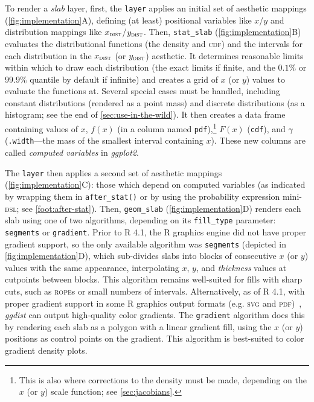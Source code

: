 \documentclass[journal]{vgtc}                     %
\begin{document}
To render a \textit{slab} layer, first, the \texttt{layer} applies an initial set of aesthetic mappings (\cref{fig:implementation}A), defining (at least) positional variables like $x$/$y$ and distribution mappings like $x_\textsc{dist}$/$y_\textsc{dist}$. Then, \texttt{stat\_slab} (\cref{fig:implementation}B) evaluates the distributional functions (the density and \textsc{cdf}) and the intervals for each distribution in the $x_\textsc{dist}$ (or $y_\textsc{dist}$) aesthetic. It determines reasonable limits within which to draw each distribution (the exact limits if finite, and the $0.1\%$ or $99.9\%$ quantile by default if infinite) and creates a grid of $x$ (or $y$) values to evaluate the functions at. Several special cases must be handled, including constant distributions (rendered as a point mass) and discrete distributions (as a histogram; see the end of \cref{sec:use-in-the-wild}). It then creates a data frame containing values of $x$,  $f(x)$ (in a column named \texttt{pdf}),\footnote{This is also where corrections to the density must be made, depending on the $x$ (or $y$) scale function; see \cref{sec:jacobians}.} $F(x)$ (\texttt{cdf}), and $\gamma$ (\texttt{.width}---the mass of the smallest interval containing $x$). These new columns are called \textit{computed variables} in \textit{ggplot2}.

The \texttt{layer} then applies a second set of aesthetic mappings (\cref{fig:implementation}C): those which depend on computed variables (as indicated by wrapping them in \texttt{after\_stat()} or by using the probability expression mini-\textsc{dsl}; see \cref{foot:after-stat}). Then, \texttt{geom\_slab} (\cref{fig:implementation}D) renders each slab using one of two algorithms, depending on its \texttt{fill\_type} parameter: \texttt{segments} or \texttt{gradient}. Prior to R 4.1, the R graphics engine did not have proper gradient support, so the only available algorithm was \texttt{segments} (depicted in \cref{fig:implementation}D), which sub-divides slabs into blocks of consecutive $x$ (or $y$) values with the same appearance, interpolating $x$, $y$, and \textit{thickness} values at cutpoints between blocks. This algorithm remains well-suited for fills with sharp cuts, such as \textsc{rope}s or small numbers of intervals. Alternatively, as of R 4.1, with proper gradient support in some R graphics output formats (e.g. \textsc{svg} and \textsc{pdf})~\cite{murrell2022vectorised}, \textit{ggdist} can output high-quality color gradients. The \texttt{gradient} algorithm does this by rendering each slab as a polygon with a linear gradient fill, using the $x$ (or $y$) positions as control points on the gradient. This algorithm is best-suited to color gradient density plots.
\end{document}

